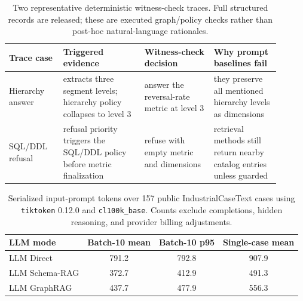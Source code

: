 \documentclass[letterpaper]{article}
\begin{document}
\begin{table}[h]
\centering
\scriptsize
\setlength{\tabcolsep}{2pt}
\begin{tabular}{@{}>{\raggedright\arraybackslash}p{0.18\linewidth}>{\raggedright\arraybackslash}p{0.27\linewidth}>{\raggedright\arraybackslash}p{0.23\linewidth}>{\raggedright\arraybackslash}p{0.22\linewidth}@{}}
\toprule
Trace case & Triggered evidence & Witness-check decision & Why prompt baselines fail \\
\midrule
Hierarchy answer & extracts three segment levels; hierarchy policy collapses to level 3 & answer the reversal-rate metric at level 3 & they preserve all mentioned hierarchy levels as dimensions \\
SQL/DDL refusal & refusal priority triggers the SQL/DDL policy before metric finalization & refuse with empty metric and dimensions & retrieval methods still return nearby catalog entries unless guarded \\
\bottomrule
\end{tabular}
\caption{Two representative deterministic witness-check traces. Full structured records are released; these are executed graph/policy checks rather than post-hoc natural-language rationales.}
\end{table}

\begin{table}[h]
\centering
\scriptsize
\begin{tabular}{lccc}
\toprule
LLM mode & Batch-10 mean & Batch-10 p95 & Single-case mean \\
\midrule
LLM Direct & 791.2 & 792.8 & 907.9 \\
LLM Schema-RAG & 372.7 & 412.9 & 491.3 \\
LLM GraphRAG & 437.7 & 477.9 & 556.3 \\
\bottomrule
\end{tabular}
\caption{Serialized input-prompt tokens over 157 public IndustrialCaseText cases using \texttt{tiktoken} 0.12.0 and \texttt{cl100k\_base}. Counts exclude completions, hidden reasoning, and provider billing adjustments.}
\end{table}
\end{document}
